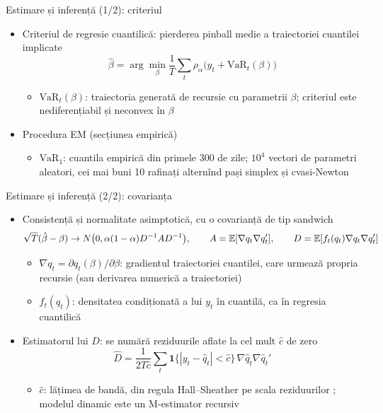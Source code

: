 \begin{frame}{Estimare și inferență (1/2): criteriul}
\itemsize{\small}
\begin{itemize}
    \item Criteriul de regresie cuantilică: pierderea pinball medie a traiectoriei cuantilei implicate
    \[ \hat\beta = \arg\min_\beta \frac1T\sum_t \rho_\alpha\big(y_t + \mathrm{VaR}_t(\beta)\big) \]
    \begin{itemize}
        \item $\mathrm{VaR}_t(\beta)$: traiectoria generată de recursie cu parametrii $\beta$; criteriul este nediferențiabil și neconvex în $\beta$
    \end{itemize}
    \item Procedura EM (secțiunea empirică)
    \begin{itemize}
        \item $\mathrm{VaR}_1$: cuantila empirică din primele 300 de zile; $10^4$ vectori de parametri aleatori, cei mai buni 10 rafinați alternînd pași simplex și cvasi-Newton
    \end{itemize}
\end{itemize}
\end{frame}

\begin{frame}{Estimare și inferență (2/2): covarianța}
\itemsize{\small}
\begin{itemize}
    \item Consistență și normalitate asimptotică, cu o covarianță de tip sandwich
    \[ \sqrt T(\hat\beta - \beta) \to N\big(0, \alpha(1 - \alpha)D^{-1}AD^{-1}\big), \qquad A = \mathbb{E}[\nabla q_t\nabla q_t'], \qquad D = \mathbb{E}[f_t(q_t)\nabla q_t\nabla q_t'] \]
    \begin{itemize}
        \item $\nabla q_t = \partial q_t(\beta)/\partial\beta$: gradientul traiectoriei cuantilei, care urmează propria recursie (sau derivarea numerică a traiectoriei)
        \item $f_t(q_t)$: densitatea condiționată a lui $y_t$ în cuantilă, ca în regresia cuantilică
    \end{itemize}
    \item Estimatorul lui $D$: se numără reziduurile aflate la cel mult $\hat c$ de zero
    \[ \hat D = \frac{1}{2T\hat c}\sum_t\mathbf 1\{|y_t - \hat q_t| < \hat c\}\,\nabla\hat q_t\nabla\hat q_t' \]
    \begin{itemize}
        \item $\hat c$: lățimea de bandă, din regula Hall--Sheather pe scala reziduurilor ; modelul dinamic este un M-estimator recursiv
    \end{itemize}
\end{itemize}
\end{frame}

